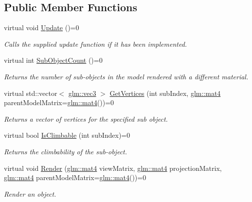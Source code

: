\subsection*{Public Member Functions}
\begin{DoxyCompactItemize}
\item 
virtual void \hyperlink{struct_agent_a511d2a3f9962d7b8b8ed8e55bb2fd9b2}{Update} ()=0
\begin{DoxyCompactList}\small\item\em Calls the supplied update function if it has been implemented. \end{DoxyCompactList}\item 
virtual int \hyperlink{struct_agent_a1088932d3e1dcce8ff7ee49a5ab64f57}{Sub\+Object\+Count} ()=0
\begin{DoxyCompactList}\small\item\em Returns the number of sub-\/objects in the model rendered with a different material. \end{DoxyCompactList}\item 
virtual std\+::vector$<$ \hyperlink{_types_8h_a3d0ce73e3199de81565fb01632415288}{glm\+::vec3} $>$ \hyperlink{struct_agent_a98530102fcae3e3ed6e97102efbfdf38}{Get\+Vertices} (int sub\+Index, \hyperlink{_types_8h_a2db59f395fe82a7394c6324956c265d8}{glm\+::mat4} parent\+Model\+Matrix=\hyperlink{_types_8h_a2db59f395fe82a7394c6324956c265d8}{glm\+::mat4}())=0
\begin{DoxyCompactList}\small\item\em Returns a vector of vertices for the specified sub object. \end{DoxyCompactList}\item 
virtual bool \hyperlink{struct_agent_a6eef7edaf0c490be38ac5b9fa4a88754}{Is\+Climbable} (int sub\+Index)=0
\begin{DoxyCompactList}\small\item\em Returns the climbability of the sub-\/object. \end{DoxyCompactList}\item 
virtual void \hyperlink{struct_agent_a7f9cd5a90b4766b24f49e5100cfe5026}{Render} (\hyperlink{_types_8h_a2db59f395fe82a7394c6324956c265d8}{glm\+::mat4} view\+Matrix, \hyperlink{_types_8h_a2db59f395fe82a7394c6324956c265d8}{glm\+::mat4} projection\+Matrix, \hyperlink{_types_8h_a2db59f395fe82a7394c6324956c265d8}{glm\+::mat4} parent\+Model\+Matrix=\hyperlink{_types_8h_a2db59f395fe82a7394c6324956c265d8}{glm\+::mat4}())=0
\begin{DoxyCompactList}\small\item\em Render an object. \end{DoxyCompactList}\item 

\end{DoxyCompactItemize}
